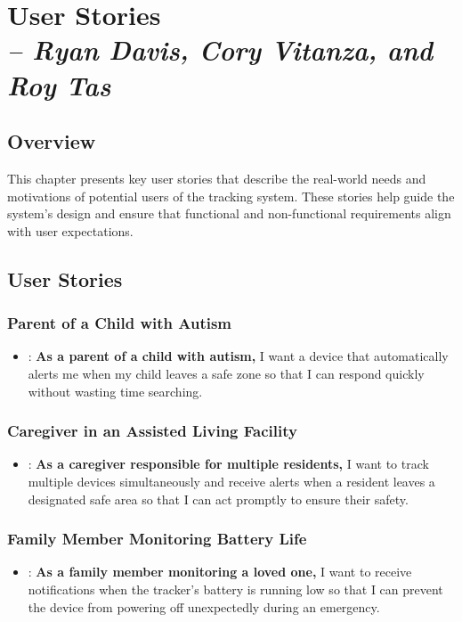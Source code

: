 \chapter{User Stories \\
\small{\textit{-- Ryan Davis, Cory Vitanza, and Roy Tas}}
\label{Chapter::UserStories}}

\section{Overview}
This chapter presents key user stories that describe the real-world needs and motivations of potential users of the tracking system. These stories help guide the system’s design and ensure that functional and non-functional requirements align with user expectations.

\section{User Stories}

\subsection{Parent of a Child with Autism}
\begin{itemize}
    \item {}: \textbf{As a parent of a child with autism,} I want a device that automatically alerts me when my child leaves a safe zone so that I can respond quickly without wasting time searching.
\end{itemize}

\subsection{Caregiver in an Assisted Living Facility}
\begin{itemize}
    \item {}: \textbf{As a caregiver responsible for multiple residents,} I want to track multiple devices simultaneously and receive alerts when a resident leaves a designated safe area so that I can act promptly to ensure their safety.
\end{itemize}

\subsection{Family Member Monitoring Battery Life}
\begin{itemize}
    \item {}: \textbf{As a family member monitoring a loved one,} I want to receive notifications when the tracker’s battery is running low so that I can prevent the device from powering off unexpectedly during an emergency.
\end{itemize}

